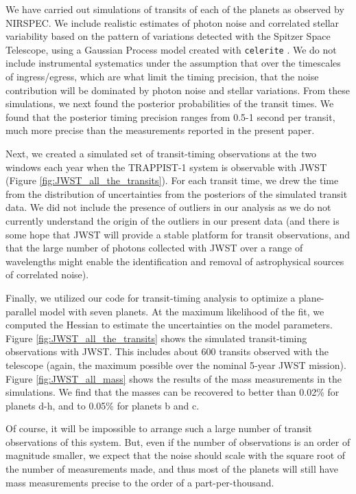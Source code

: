 \documentclass[fleqn,usenatbib]{mnras} %
\begin{document}
We have carried out simulations of transits of each of the planets as observed by NIRSPEC.  We include realistic estimates of photon noise and correlated stellar variability based on the pattern of variations detected with the Spitzer Space Telescope, using a Gaussian Process model created with \texttt{celerite} \citep{ForemanMackey2017}.  We do not include instrumental systematics under the assumption that over the timescales of ingress/egress, which are what limit the timing precision, that the noise contribution will be dominated by photon noise and stellar variations.
From these simulations, we
next found the posterior probabilities of the transit times.   We found that the posterior timing precision ranges from 0.5-1 second per transit, much more precise than the measurements reported in the present paper.

Next, we created a simulated set of transit-timing observations at the two windows each year when the TRAPPIST-1 system is observable with JWST (Figure \ref{fig:JWST_all_the_transits}).   For each transit time, we drew the time from the distribution of uncertainties from the posteriors of the simulated transit data.  We did not include the presence of outliers in our analysis as we do not currently understand the origin of the outliers in our present data (and there is some hope that JWST will provide a stable platform for transit observations, and that the large number of photons collected with JWST over a range of wavelengths might enable the identification and removal of astrophysical sources of correlated noise).

Finally, we utilized our code for transit-timing analysis  to optimize a plane-parallel model with seven planets.  At the maximum likelihood of the fit, we computed the Hessian to estimate the uncertainties on the model parameters.  Figure \ref{fig:JWST_all_the_transits} shows the simulated transit-timing observations with JWST.   This includes about 600 transits observed with the telescope (again, the maximum possible over the nominal 5-year JWST mission).  Figure \ref{fig:JWST_all_mass} shows the results of the mass measurements in the simulations.  We find that the masses can be recovered to better than 0.02\% for planets d-h, and to 0.05\% for planets b and c.

Of course, it will be impossible to arrange such a large number of transit observations of this system.  But, even if the number of observations is an order of magnitude smaller, we expect that the noise should scale with the square root of the number of measurements made, and thus most of the planets will still have mass measurements precise to the order of a part-per-thousand.  
\end{document}

